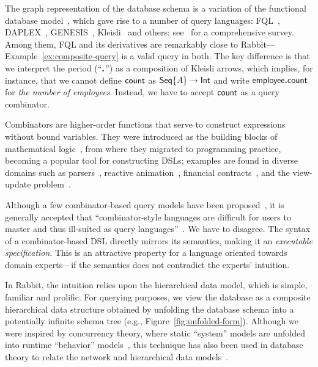 The graph representation of the database schema is a variation of the
functional database model~\cite{Kerschberg1976, Sibley1977}, which gave rise to
a number of query languages: FQL~\cite{Buneman1979}, DAPLEX~\cite{Shipman1981},
GENESIS~\cite{Batory1988}, Kleisli~\cite{Wong2000} and others;
see~\cite{Gray2004} for a comprehensive survey.  Among them, FQL and its
derivatives are remarkably close to Rabbit---Example~\ref{ex:composite-query}
is a valid query in both.  The key difference is that we interpret the period
(``$\boldsymbol{.}$'') as a composition of Kleisli arrows, which implies, for instance,
that we cannot define $\mathsf{count}$ as $\mathsf{Seq}{\left\{A\right\}}\to\mathsf{Int}$ and write
$\mathsf{employee}\boldsymbol{.}\mathsf{count}$ for \emph{the number of employees}.  Instead, we have to
accept $\mathsf{count}$ as a query combinator.

Combinators are higher-order functions that serve to construct expressions
without bound variables.  They were introduced as the building blocks of
mathematical logic~\cite{Schoenfinkel1924, Curry1930}, from where they migrated
to programming practice, becoming a popular tool for constructing DSLs;
examples are found in diverse domains such as parsers~\cite{Wadler1985,
Hutton1996}, reactive animation~\cite{Elliott1997}, financial
contracts~\cite{Jones2000}, and the view-update problem~\cite{Foster2005}.

Although a few combinator-based query models have been
proposed~\cite{Buneman1979, Bossi1984, Batory1988, Erwig1991, Cherniack1996},
it is generally accepted that ``combinator-style languages are difficult for
users to master and thus ill-suited as query languages''~\cite{Cherniack1996}.
We have to disagree.  The syntax of a combinator-based DSL directly mirrors its
semantics, making it an \emph{executable specification}.  This is an attractive
property for a language oriented towards domain experts---if the semantics does
not contradict the experts' intuition.

In Rabbit, the intuition relies upon the hierarchical data model, which is
simple, familiar and prolific.  For querying purposes, we view the database as
a composite hierarchical data structure obtained by unfolding the database
schema into a potentially infinite schema tree (e.g.,
Figure~\ref{fig:unfolded-form}).  Although we were inspired by concurrency
theory, where static ``system'' models are unfolded into runtime ``behavior''
models~\cite{Nielsen1994}, this technique has also been used in database theory
to relate the network and hierarchical data models~\cite{Cartmell1985}.

